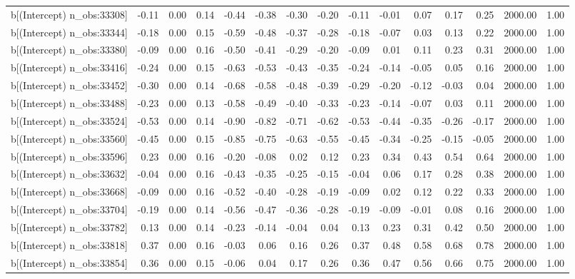 \begin{table}[ht]
\begin{tabular}{rrrrrrrrrrrrrrr}
  b[(Intercept) n\_obs:33308] & -0.11 & 0.00 & 0.14 & -0.44 & -0.38 & -0.30 & -0.20 & -0.11 & -0.01 & 0.07 & 0.17 & 0.25 & 2000.00 & 1.00 \\ 
  b[(Intercept) n\_obs:33344] & -0.18 & 0.00 & 0.15 & -0.59 & -0.48 & -0.37 & -0.28 & -0.18 & -0.07 & 0.03 & 0.13 & 0.22 & 2000.00 & 1.00 \\ 
  b[(Intercept) n\_obs:33380] & -0.09 & 0.00 & 0.16 & -0.50 & -0.41 & -0.29 & -0.20 & -0.09 & 0.01 & 0.11 & 0.23 & 0.31 & 2000.00 & 1.00 \\ 
  b[(Intercept) n\_obs:33416] & -0.24 & 0.00 & 0.15 & -0.63 & -0.53 & -0.43 & -0.35 & -0.24 & -0.14 & -0.05 & 0.05 & 0.16 & 2000.00 & 1.00 \\ 
  b[(Intercept) n\_obs:33452] & -0.30 & 0.00 & 0.14 & -0.68 & -0.58 & -0.48 & -0.39 & -0.29 & -0.20 & -0.12 & -0.03 & 0.04 & 2000.00 & 1.00 \\ 
  b[(Intercept) n\_obs:33488] & -0.23 & 0.00 & 0.13 & -0.58 & -0.49 & -0.40 & -0.33 & -0.23 & -0.14 & -0.07 & 0.03 & 0.11 & 2000.00 & 1.00 \\ 
  b[(Intercept) n\_obs:33524] & -0.53 & 0.00 & 0.14 & -0.90 & -0.82 & -0.71 & -0.62 & -0.53 & -0.44 & -0.35 & -0.26 & -0.17 & 2000.00 & 1.00 \\ 
  b[(Intercept) n\_obs:33560] & -0.45 & 0.00 & 0.15 & -0.85 & -0.75 & -0.63 & -0.55 & -0.45 & -0.34 & -0.25 & -0.15 & -0.05 & 2000.00 & 1.00 \\ 
  b[(Intercept) n\_obs:33596] & 0.23 & 0.00 & 0.16 & -0.20 & -0.08 & 0.02 & 0.12 & 0.23 & 0.34 & 0.43 & 0.54 & 0.64 & 2000.00 & 1.00 \\ 
  b[(Intercept) n\_obs:33632] & -0.04 & 0.00 & 0.16 & -0.43 & -0.35 & -0.25 & -0.15 & -0.04 & 0.06 & 0.17 & 0.28 & 0.38 & 2000.00 & 1.00 \\ 
  b[(Intercept) n\_obs:33668] & -0.09 & 0.00 & 0.16 & -0.52 & -0.40 & -0.28 & -0.19 & -0.09 & 0.02 & 0.12 & 0.22 & 0.33 & 2000.00 & 1.00 \\ 
  b[(Intercept) n\_obs:33704] & -0.19 & 0.00 & 0.14 & -0.56 & -0.47 & -0.36 & -0.28 & -0.19 & -0.09 & -0.01 & 0.08 & 0.16 & 2000.00 & 1.00 \\ 
  b[(Intercept) n\_obs:33782] & 0.13 & 0.00 & 0.14 & -0.23 & -0.14 & -0.04 & 0.04 & 0.13 & 0.23 & 0.31 & 0.42 & 0.50 & 2000.00 & 1.00 \\ 
  b[(Intercept) n\_obs:33818] & 0.37 & 0.00 & 0.16 & -0.03 & 0.06 & 0.16 & 0.26 & 0.37 & 0.48 & 0.58 & 0.68 & 0.78 & 2000.00 & 1.00 \\ 
  b[(Intercept) n\_obs:33854] & 0.36 & 0.00 & 0.15 & -0.06 & 0.04 & 0.17 & 0.26 & 0.36 & 0.47 & 0.56 & 0.66 & 0.75 & 2000.00 & 1.00 \\ 

\end{tabular}
\end{table}
